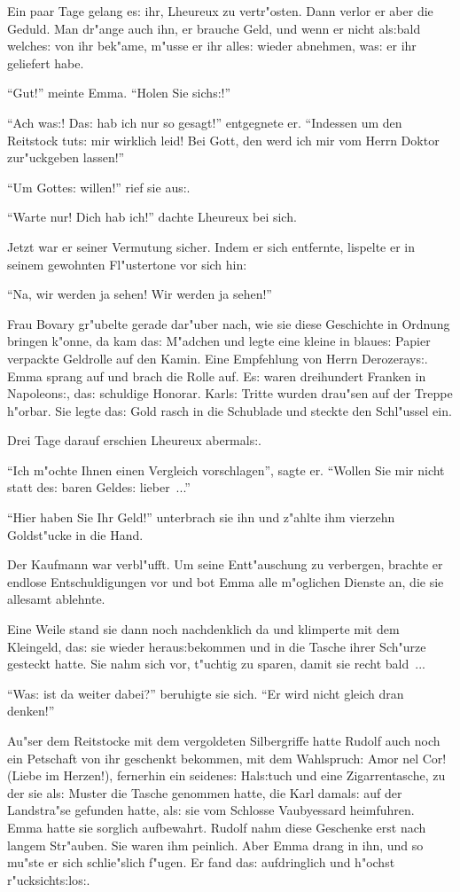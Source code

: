 \documentclass[oneside,12pt]{book}
\newenvironment{antiqua}{\normalfont}{}%
\newcommand{\s}{s:}%
\begin{document}
Ein paar Tage gelang e{\s} ihr, Lheureux zu vertr"osten. Dann
verlor er aber die Geduld. Man dr"ange auch ihn, er brauche Geld,
und wenn er nicht al{\s}bald welche{\s} von ihr bek"ame, m"usse er
ihr alle{\s} wieder abnehmen, wa{\s} er ihr geliefert habe.

"`Gut!"' meinte Emma. "`Holen Sie sich{\s}!"'

"`Ach wa{\s}! Da{\s} hab ich nur so gesagt!"' entgegnete er.
"`Indessen um den Reitstock tut{\s} mir wirklich leid! Bei Gott,
den werd ich mir vom Herrn Doktor zur"uckgeben lassen!"'

"`Um Gotte{\s} willen!"' rief sie au{\s}.

"`Warte nur! Dich hab ich!"' dachte Lheureux bei sich.

Jetzt war er seiner Vermutung sicher. Indem er sich entfernte,
lispelte er in seinem gewohnten Fl"ustertone vor sich hin:

"`Na, wir werden ja sehen! Wir werden ja sehen!"'

Frau Bovary gr"ubelte gerade dar"uber nach, wie sie diese Geschichte
in Ordnung bringen k"onne, da kam da{\s} M"adchen und legte eine
kleine in blaue{\s} Papier verpackte Geldrolle auf den Kamin. Eine
Empfehlung von Herrn Derozeray{\s}. Emma sprang auf und brach die
Rolle auf. E{\s} waren dreihundert Franken in Napoleon{\s}, da{\s}
schuldige Honorar. Karl{\s} Tritte wurden drau"sen auf der Treppe
h"orbar. Sie legte da{\s} Gold rasch in die Schublade und steckte
den Schl"ussel ein.

Drei Tage darauf erschien Lheureux abermal{\s}.

"`Ich m"ochte Ihnen einen Vergleich vorschlagen"', sagte er.
"`Wollen Sie mir nicht statt de{\s} baren Gelde{\s} lieber~..."'

"`Hier haben Sie Ihr Geld!"' unterbrach sie ihn und z"ahlte ihm
vierzehn Goldst"ucke in die Hand.

Der Kaufmann war verbl"ufft. Um seine Entt"auschung zu verbergen,
brachte er endlose Entschuldigungen vor und bot Emma alle
m"oglichen Dienste an, die sie allesamt ablehnte.

Eine Weile stand sie dann noch nachdenklich da und klimperte mit
dem Kleingeld, da{\s} sie wieder herau{\s}bekommen und in die
Tasche ihrer Sch"urze gesteckt hatte. Sie nahm sich vor, t"uchtig
zu sparen, damit sie recht bald~...

"`Wa{\s} ist da weiter dabei?"' beruhigte sie sich. "`Er wird
nicht gleich dran denken!"'

Au"ser dem Reitstocke mit dem vergoldeten Silbergriffe hatte
Rudolf auch noch ein Petschaft von ihr geschenkt bekommen, mit dem
Wahlspruch: \begin{antiqua}Amor nel Cor!\end{antiqua} (Liebe im
Herzen!), fernerhin ein seidene{\s} Hal{\s}tuch und eine
Zigarrentasche, zu der sie al{\s} Muster die Tasche genommen
hatte, die Karl damal{\s} auf der Landstra"se gefunden hatte,
al{\s} sie vom Schlosse Vaubyessard heimfuhren. Emma hatte sie
sorglich aufbewahrt. Rudolf nahm diese Geschenke erst nach langem
Str"auben. Sie waren ihm peinlich. Aber Emma drang in ihn, und so
mu"ste er sich schlie"slich f"ugen. Er fand da{\s} aufdringlich
und h"ochst r"ucksicht{\s}lo{\s}.
\end{document}
